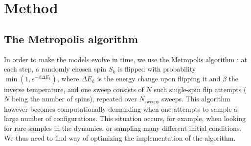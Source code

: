 \section{Method}\label{sec:method}
\subsection{The Metropolis algorithm}
In order to make the models evolve in time, we use the Metropolis algorithm \cite{Metropolis1953}: at each step, a randomly chosen spin $S_k$ is flipped with probability $\min\left(1, e^{-\beta \Delta E_k}\right)$, where $\Delta E_k$ is the energy change upon flipping it and $\beta$ the inverse temperature, and one sweep consists of $N$ such single-spin flip attempts ($N$ being the number of spins), repeated over $N_\text{sweeps}$ sweeps.
This algorithm however becomes computationally demanding when one attempts to sample a large number of configurations. This situation occurs, for example, when looking for rare samples in the dynamics, or sampling many different initial conditions. We thus need to find way of optimizing the implementation of the algorithm.

